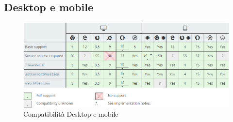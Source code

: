 \documentclass[11pt ,a4paper , twoside , openright ]{book}
\begin{document}
	\subsection{Desktop e mobile}
	\begin{figure}[h]
		\centering
		\includegraphics[width=1\linewidth]{compatibility}
		\caption{Compatibilità Desktop e mobile}
		\label{fig: Compatibilità Desktop e mobile}
	\end{figure}
\end{document}
